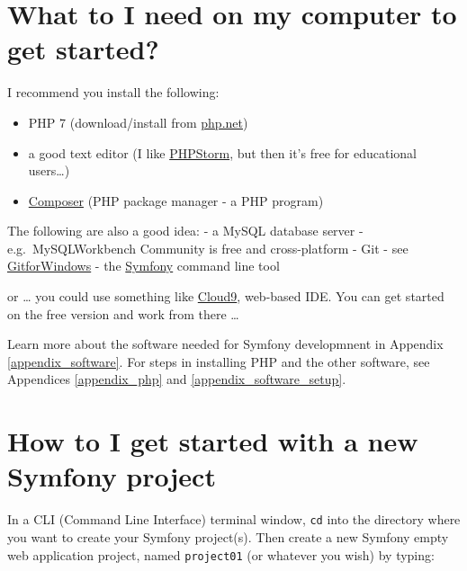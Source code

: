 \documentclass[a4paperpaper,openright]{book}
\newenvironment{Shaded}{}{}
\newcommand{\ExtensionTok}[1]{#1}
\newcommand{\NormalTok}[1]{#1}
\providecommand{\tightlist}{%
  \setlength{\itemsep}{0pt}\setlength{\parskip}{0pt}}
\begin{document}
\hypertarget{what-to-i-need-on-my-computer-to-get-started}{%
\section{What to I need on my computer to get
started?}\label{what-to-i-need-on-my-computer-to-get-started}}

I recommend you install the following:

\begin{itemize}
\tightlist
\item
  PHP 7 (download/install from \href{https://php.net/}{php.net})
\item
  a good text editor (I like
  \href{https://www.jetbrains.com/phpstorm/specials/phpstorm/phpstorm.html?\&gclid=CJTK_8SDrtICFWq-7Qodh98NpQ\&gclsrc=aw.ds.ds\&dclid=CNPY28WDrtICFQGn7QodqekBWg}{PHPStorm},
  but then it's free for educational users\ldots{})
\item
  \href{https://getcomposer.org/}{Composer} (PHP package manager - a PHP
  program)
\end{itemize}

The following are also a good idea: - a MySQL database server -
e.g.~MySQLWorkbench Community is free and cross-platform - Git - see
\href{https://git-scm.com/download/win}{GitforWindows} - the
\href{https://symfony.com/download}{Symfony} command line tool

or \ldots{} you could use something like
\href{https://c9.io/dr_matt_smith}{Cloud9}, web-based IDE. You can get
started on the free version and work from there \ldots{}

Learn more about the software needed for Symfony developmnent in
Appendix \ref{appendix_software}. For steps in installing PHP and the
other software, see Appendices \ref{appendix_php} and
\ref{appendix_software_setup}.

\hypertarget{how-to-i-get-started-with-a-new-symfony-project}{%
\section{How to I get started with a new Symfony
project}\label{how-to-i-get-started-with-a-new-symfony-project}}

In a CLI (Command Line Interface) terminal window, \texttt{cd} into the
directory where you want to create your Symfony project(s). Then create
a new Symfony empty web application project, named \texttt{project01}
(or whatever you wish) by typing:

\begin{Shaded}
\end{Shaded}
\end{document}
